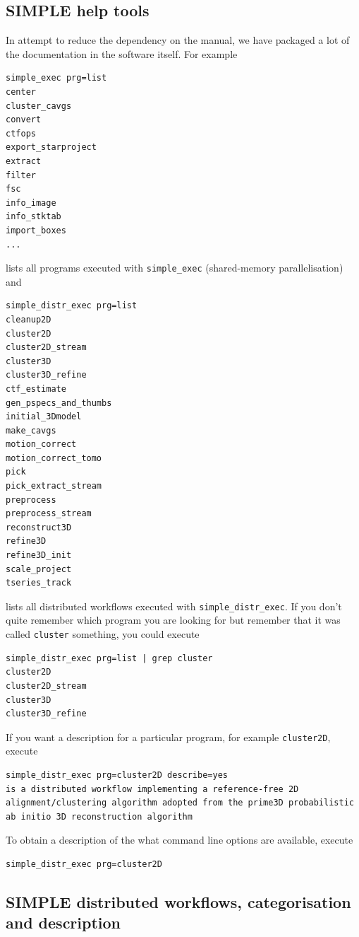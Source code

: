 \documentclass[a4paper,11pt]{article}
\newcommand{\prgname}[1]{\textcolor{NavyBlue}{\texttt{#1}}}
\begin{document}
\subsection{SIMPLE help tools}
In attempt to reduce the dependency on the manual, we have packaged a lot of the documentation in the software itself. For example
\begin{Verbatim}[commandchars=+\[\],fontsize=\small,breaklines=true]
simple_exec prg=list
center
cluster_cavgs
convert
ctfops
export_starproject
extract
filter
fsc
info_image
info_stktab
import_boxes
...
\end{Verbatim}
lists all programs executed with \texttt{simple\_exec} (shared-memory parallelisation) and
\begin{Verbatim}[commandchars=+\[\],fontsize=\small,breaklines=true]
simple_distr_exec prg=list
cleanup2D
cluster2D
cluster2D_stream
cluster3D
cluster3D_refine
ctf_estimate
gen_pspecs_and_thumbs
initial_3Dmodel
make_cavgs
motion_correct
motion_correct_tomo
pick
pick_extract_stream
preprocess
preprocess_stream
reconstruct3D
refine3D
refine3D_init
scale_project
tseries_track
\end{Verbatim}
lists all distributed workflows executed with \texttt{simple\_distr\_exec}. If you don't quite remember which program you are looking for but remember that it was called \texttt{cluster} something, you could execute
\begin{Verbatim}[commandchars=+\[\],fontsize=\small,breaklines=true]
simple_distr_exec prg=list | grep cluster
cluster2D
cluster2D_stream
cluster3D
cluster3D_refine
\end{Verbatim}
If you want a description for a particular program, for example \prgname{cluster2D}, execute
\begin{Verbatim}[commandchars=+\[\],fontsize=\small,breaklines=true]
simple_distr_exec prg=cluster2D describe=yes
is a distributed workflow implementing a reference-free 2D alignment/clustering algorithm adopted from the prime3D probabilistic ab initio 3D reconstruction algorithm
\end{Verbatim}
To obtain a description of the what command line options are available, execute
\begin{Verbatim}[commandchars=+\[\],fontsize=\small,breaklines=true]
simple_distr_exec prg=cluster2D
\end{Verbatim}

\subsection{SIMPLE distributed workflows, categorisation and description}
\end{document}
